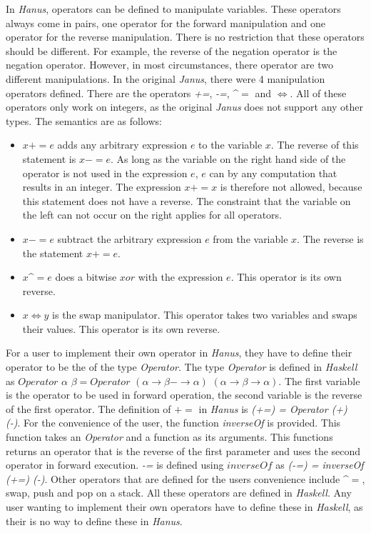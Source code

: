 \documentclass[12pt,a4paper]{article}
\begin{document}
	In \textit{Hanus}, operators can be defined to manipulate variables.  These operators always come in pairs, one operator for the forward manipulation and one operator for the reverse manipulation. There is no restriction that these operators should be different. For example, the reverse of the negation operator is the negation operator. However, in most circumstances, there operator are two different manipulations. In the original \textit{Janus}, there were 4 manipulation operators defined. There are the operators \textit{+=}, \textit{-=}, \textasciicircum$=$ and $\Leftrightarrow$. All of these operators only work on integers, as the original \textit{Janus} does not support any other types. The semantics are as follows:
	\begin{itemize}
		\item $x+=e$ adds any arbitrary expression $e$ to the variable $x$. The reverse of this statement is $x-=e$. As long as the variable on the right hand side of the operator is not used in the expression $e$, $e$ can by any computation that results in an integer. The expression $x+=x$ is therefore not allowed, because this statement does not have a reverse. The constraint that the variable on the left can not occur on the right applies for all operators.
		\item $x-=e$ subtract the arbitrary expression $e$ from the variable $x$. The reverse is the statement $x+=e$.
		\item $x$\textasciicircum$=e$ does a bitwise $xor$ with the expression $e$. This operator is its own reverse. 
		\item $x\Leftrightarrow y$ is the swap manipulator. This operator takes two variables and swaps their values. This operator is its own reverse. 
	\end{itemize}
	For a user to implement their own operator in \textit{Hanus}, they have to define their operator to be the of the type \textit{Operator}. The type \textit{Operator} is defined in \textit{Haskell} as $Operator$ $\alpha$ $\beta = Operator$ $ (\alpha \rightarrow  \beta -\rightarrow  \alpha)$ $(\alpha \rightarrow  \beta \rightarrow \alpha)$. The first variable is the operator to be used in forward operation, the second variable is the reverse of the first operator. The definition of $+=$ in \textit{Hanus} is \textit{(+=) = Operator  (+) (-)}. For the convenience of the user, the function \textit{inverseOf} is provided. This function takes an \textit{Operator} and a function as its arguments. This functions returns an operator that is the reverse of the first parameter and uses the second operator in forward execution. \textit{-=} is defined using $inverseOf$ as \textit{(-=) = inverseOf (+=) (-)}. Other operators that are defined for the users convenience include \textasciicircum$=$, swap, push and pop on a stack. All these operators are defined in \textit{Haskell}. Any user wanting to implement their own operators have to define these in \textit{Haskell}, as their is no way to define these in \textit{Hanus}.
\end{document}
